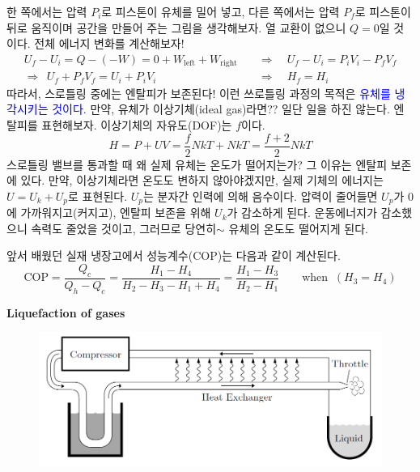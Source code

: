 \documentclass{article}
\begin{document}
한 쪽에서는 압력 $P_i$로 피스톤이 유체를 밀어 넣고, 다른 쪽에서는 압력 $P_f$로 피스톤이 뒤로 움직이며 공간을 만들어 주는 그림을 생각해보자. 열 교환이 없으니 $Q=0$일 것이다. 전체 에너지 변화를 계산해보자!
\begin{align}
    U_f - U_i = Q - (-W) = 0 + W_\text{left} + W_\text{right} \quad &\Rightarrow \quad U_f - U_i = P_i V_i - P_f V_f\\
    \Rightarrow \ \ U_f + P_f V_f = U_i + P_i V_i \quad &\Rightarrow \quad H_f = H_i
\end{align}
따라서, 스로틀링 중에는 엔탈피가 보존된다! 이런 쓰로틀링 과정의 목적은 \textcolor{blue}{유체를 냉각시키는 것이다.} 만약, 유체가 이상기체(ideal gas)라면?? 일단 일을 하진 않는다. 엔탈피를 표현해보자. 이상기체의 자유도(DOF)는 $f$이다.
\begin{equation}
    H = P + UV = \frac{f}{2} NkT + NkT = \frac{f + 2}{2} NkT
\end{equation}
스로틀링 밸브를 통과할 때 왜 실제 유체는 온도가 떨어지는가? 그 이유는 엔탈피 보존에 있다. 만약, 이상기체라면 온도도 변하지 않아야겠지만, 실제 기체의 에너지는 $U = U_k + U_p$로 표현된다. $U_p$는 분자간 인력에 의해 음수이다. 압력이 줄어들면 $U_p$가 0에 가까워지고(커지고), 엔탈피 보존을 위해 $U_k$가 감소하게 된다. 운동에너지가 감소했으니 속력도 줄었을 것이고, 그러므로 당연히$\sim$ 유체의 온도도 떨어지게 된다.

\newpage

\noindent
앞서 배웠던 실재 냉장고에서 성능계수(COP)는 다음과 같이 계산된다.
\begin{equation}
    \text{COP} = \frac{Q_c}{Q_h - Q_c} = \frac{H_1 - H_4}{H_2 - H_3 - H_1 + H_4} = \frac{H_1 - H_3}{H_2 - H_1} \qquad \text{when }\  (H_3 = H_4)
\end{equation}

\noindent
\textbf{Liquefaction of gases}

\begin{figure}[h]
    \centering
    \includegraphics[width=0.7\linewidth]{images/fig4_3.png}
\end{figure}
\end{document}
